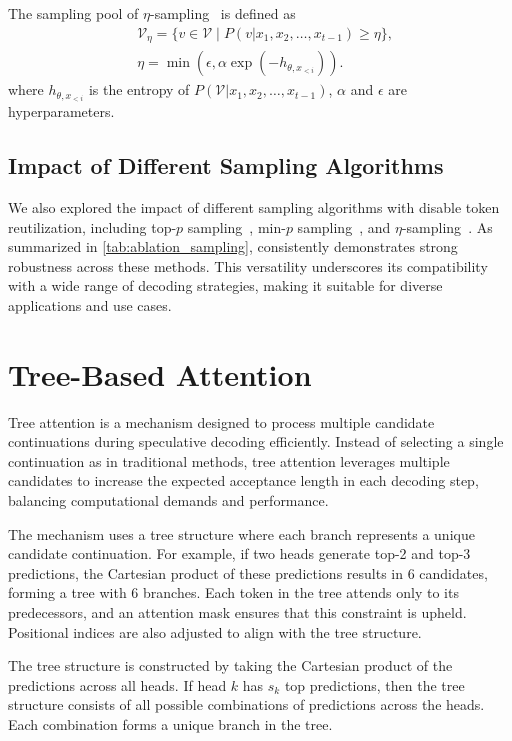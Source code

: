 The sampling pool of $\eta$-sampling~\citep{eta} is defined as
\begin{equation}
\nonumber
    \begin{aligned}
        &\mathcal{V}_{\eta}=\{v\in\mathcal{V}\mid P(v|x_1,x_2,\ldots,x_{t-1})\geq \eta\}, \\
        & \eta =\min\left(\epsilon,\alpha\exp(-h_{\theta,x_{<i}})\right).
    \end{aligned}
\end{equation}
where ${h}_{\theta,x_{<i}}$ is the entropy of $P(\mathcal{V}|x_1,x_2,\ldots,x_{t-1})$, $\alpha$ and $\epsilon$ are hyperparameters.

\subsection{Impact of Different Sampling Algorithms}
We also explored the impact of different sampling algorithms with disable token reutilization, including top-$p$ sampling~\citep{topp}, min-$p$ sampling~\citep{minp}, and $\eta$-sampling~\citep{eta}. As summarized in \cref{tab:ablation_sampling}, \ours consistently demonstrates strong robustness across these methods. This versatility underscores its compatibility with a wide range of decoding strategies, making it suitable for diverse applications and use cases.




\section{Tree-Based Attention}
\label{app:tree_attn}
Tree attention is a mechanism designed to process multiple candidate continuations during speculative decoding efficiently. Instead of selecting a single continuation as in traditional methods, tree attention leverages multiple candidates to increase the expected acceptance length in each decoding step, balancing computational demands and performance.

The mechanism uses a tree structure where each branch represents a unique candidate continuation. For example, if two heads generate top-2 and top-3 predictions, the Cartesian product of these predictions results in 6 candidates, forming a tree with 6 branches. Each token in the tree attends only to its predecessors, and an attention mask ensures that this constraint is upheld. Positional indices are also adjusted to align with the tree structure.

The tree structure is constructed by taking the Cartesian product of the predictions across all heads. If head \( k \) has \( s_k \) top predictions, then the tree structure consists of all possible combinations of predictions across the heads. Each combination forms a unique branch in the tree.

